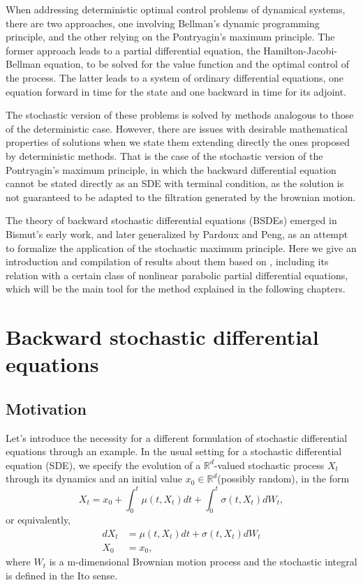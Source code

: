 When addressing deterministic optimal control problems of dynamical systems, there are two approaches, one involving Bellman's dynamic programming principle, and the other relying on the Pontryagin's maximum principle. The former approach leads to a partial differential equation, the Hamilton-Jacobi-Bellman equation, to be solved for the value function and the optimal control of the process. The latter leads to a system of ordinary differential equations, one equation forward in time for the state and one backward in time for its adjoint.

The stochastic version of these problems is solved by methods analogous to those of the deterministic case. However, there are issues with desirable mathematical properties of solutions when we state them extending directly the ones proposed by deterministic methods. That is the case of the stochastic version of the Pontryagin's maximum principle, in which the backward differential equation cannot be stated directly as an SDE with terminal condition, as the solution is not guaranteed to be adapted to the filtration generated by the brownian motion.

The theory of backward stochastic differential equations (BSDEs) emerged in Bismut's \cite{bismut_conjugate_1973} early work, and later generalized by Pardoux and Peng\cite{pardoux_adapted_1990}, as an attempt to formalize the application of the stochastic maximum principle. Here we give an introduction and compilation of results about them based on \cite{zhang_backward_2017,pardoux_stochastic_2014,romero_maestro_nodate,touzi_optimal_2013}, including its relation with a certain class of nonlinear parabolic partial differential equations, which will be the main tool for the method explained in the following chapters. 
\section{Backward stochastic differential equations}
\subsection{Motivation}
Let's introduce the necessity for a different formulation of stochastic differential equations through an example. In the usual setting for a stochastic differential equation (SDE), we specify the evolution of a $\mathbb{R}^d$-valued stochastic process $X_t$ through its dynamics and an initial value $x_0\in \mathbb{R}^d$(possibly random), in the form
\begin{equation}
	X_t=x_0 +\int_{0}^{t}\mu(t,X_t)dt+\int_{0}^{t} \sigma(t,X_t) dW_t,
\end{equation}
or equivalently,
\begin{equation}
	\label{eqn:SDE}
	\begin{split}
		dX_t&=\mu(t,X_t)dt+\sigma(t,X_t)dW_t\\
		X_0&=x_0,
	\end{split}
\end{equation}
where $W_t$ is a m-dimensional Brownian motion process and the stochastic integral is defined in the Ito sense.

